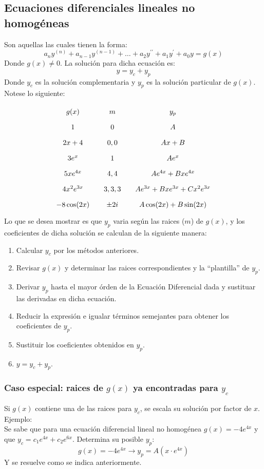 \documentclass[letterpaper, 12pt]{article}
\begin{document}
\begin{justify}
        \subsection{Ecuaciones diferenciales lineales no homogéneas}
        \justify
        Son aquellas las cuales tienen la forma:
        {\large\[a_ny^{(n)}+a_{n-1}y^{(n-1)}+\dots+a_2y^{\prime\prime}+a_1y^{\prime}+a_0y=g(x)\]}
        Donde \(g(x)\neq 0\). La solución para dicha ecuación es:
        {\large\[y=y_c+y_p\]}
        Donde \(y_c\) es la solución complementaria y \(y_p\) es la solución particular de \(g(x)\).
        \\\newline
        Notese lo siguiente:
        {\large\[\arraycolsep=10pt\def\arraystretch{1.8}\begin{array}{ccc}
            g(x) & m & y_p\\
            1 & 0 & A\\
            2x+4 & 0,0 & Ax+B\\
            3e^x & 1 & Ae^x\\
            5xe^{4x} & 4,4 & Ae^{4x} + Bxe^{4x}\\
            4x^2e^{3x} & 3,3,3 & Ae^{3x} + Bxe^{3x} + Cx^2e^{3x}\\
            -8\cos(2x) & \pm 2i & A\cos(2x) + B\sin(2x)
        \end{array}\]}
        \justify
        Lo que se desea mostrar es que \(y_p\) varia según las raices (\(m\)) de \(g(x)\), y los coeficientes de dicha solución se calculan de la siguiente manera:
        \begin{enumerate}
            \item Calcular \(y_c\) por los métodos anteriores.
            \item Revisar \(g(x)\) y determinar las raices correspondientes y la ``plantilla'' de \(y_p\).
            \item Derivar \(y_p\) hasta el mayor órden de la Ecuación Diferencial dada y sustituar las derivadas en dicha ecuación.
            \item Reducir la expresión e igualar términos semejantes para obtener los coeficientes de \(y_p\).
            \item Sustituir los coeficientes obtenidos en \(y_p\).
            \item \(y=y_c+y_p\).
        \end{enumerate}
        \subsubsection{Caso especial: raices de \(g(x)\) ya encontradas para \(y_c\)}
        \justify
        Si \(g(x)\) contiene una de las raices para \(y_c\), se escala su solución por factor de \(x\).
        \\\newline
        Ejemplo:
        \\
        Se sabe que para una ecuación diferencial lineal no homogénea \(g(x)=-4e^{4x}\) y que \(y_c=c_1e^{4x}+c_2e^{6x}\). Determina su posible \(y_p\):
        {\large\[g(x)=-4e^{4x}\rightarrow y_p=A\left(x\cdot e^{4x}\right)\]}
        Y se resuelve como se indica anteriormente.

\end{justify}
\end{document}
